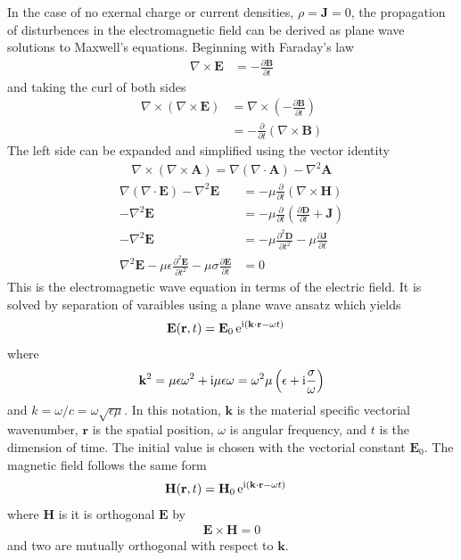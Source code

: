 In the case of no exernal charge or current densities, $\rho=\mathbf{J}=0$,
the propagation of disturbences in the electromagnetic field can be derived
as plane wave solutions to Maxwell's equations.  Beginning with Faraday's law
\begin{align}
\nabla \times \mathbf{E} &= -\frac{\partial \mathbf{B}} {\partial t}
\end{align}
and taking the curl of both sides
\begin{align}
\nabla \times
\left(\nabla\times\mathbf{E}\right)&=\nabla\times\left(-\frac{\partial\mathbf{B}}{\partial
t}\right)\\
&=-\frac{\partial}{\partial t}\left(\nabla \times \mathbf{B}\right)
\end{align}
The left side can be expanded and simplified using the vector identity
\begin{align}
\nabla \times \left( \nabla \times \mathbf{A} \right) = \nabla \left(
\nabla \cdot \mathbf{A} \right) - \nabla^2 \mathbf{A}
\end{align}
\begin{align}
\nabla\left(\nabla\cdot\mathbf{E}\right)-\nabla^2\mathbf{E}
&=-\mu\frac{\partial}{\partial t}\left(\nabla \times \mathbf{H}\right)\\
-\nabla^2\mathbf{E}&=-\mu\frac{\partial}{\partial t}\left( \frac{\partial \mathbf{D}}{\partial t} + \mathbf{J}\right) \\
-\nabla^2\mathbf{E}&=-\mu\frac{\partial^2 \mathbf{D}}{\partial t^2} -\mu\frac{\partial\mathbf{J}}{\partial t} \\
\nabla^2\mathbf{E} -\mu\epsilon\frac{\partial^2 \mathbf{E}}{\partial t^2} -\mu\sigma\frac{\partial\mathbf{E}}{\partial t}  &= 0 
\label{eqn:ewe}
\end{align}
This is the electromagnetic wave equation in terms of the electric field.
It is solved by separation of varaibles using a plane wave
ansatz which yields
\begin{align}
 \mathbf{E} ( \mathbf{r}, t ) &= \mathbf{E}_0\, {\mathrm{e}}^{{\mathrm{i}} (\mathbf{k}
 \cdot \mathbf{r} - \omega t )}
\label{eqn:planewaves}
\end{align}
where
\begin{equation}
 \mathbf{k}^2 = \mu \epsilon \omega^2 + {\mathrm{i}} \mu \epsilon \omega = \omega^2 \mu \left(\epsilon + {\mathrm{i}} \frac{\sigma}{\omega}\right)
 \label{eqn:planewavedispersion}
\end{equation}
and $k=\omega/c=\omega\sqrt{\epsilon\mu}$.  In this notation,
$\mathbf{k}$ is the material specific vectorial wavenumber, $\mathbf{r}$ is the
spatial position, $\omega$ is angular frequency, and $t$ is
the dimension of time.
The initial value is chosen with the vectorial constant $\mathbf{E}_0$.
The magnetic field follows the same form
\begin{align}
 \mathbf{H} ( \mathbf{r}, t ) &= \mathbf{H}_0\, {\mathrm{e}}^{{\mathrm{i}} (\mathbf{k}
 \cdot \mathbf{r} - \omega t )}
\end{align}
where $\mathbf{H}$ is it is orthogonal $\mathbf{E}$ by 
\begin{align}
\mathbf{E} \times \mathbf{H} = 0
\end{align}
and two are mutually orthogonal with respect to $\mathbf{k}$.
